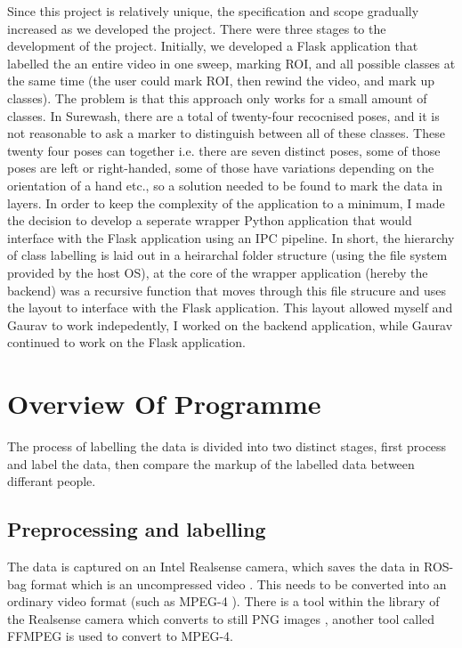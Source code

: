 Since this project is relatively unique, the specification and scope gradually increased as we developed the project. There were three stages to the development of the project. Initially, we developed a Flask application that labelled the an entire video in one sweep, marking ROI, and all possible classes at the same time (the user could mark ROI, then rewind the video, and mark up classes). The problem is that this approach only works for a small amount of classes. In Surewash, there are a total of twenty-four recocnised poses, and it is not reasonable to ask a marker to distinguish between all of these classes. These twenty four poses can together i.e. there are seven distinct poses, some of those poses are left or right-handed, some of those have variations depending on the orientation of a hand etc., so a solution needed to be found to mark the data in layers. In order to keep the complexity of the application to a minimum, I made the decision to develop a seperate wrapper Python application that would interface with the Flask application using an IPC pipeline. In short, the hierarchy of class labelling is laid out in a heirarchal folder structure (using the file system provided by the host OS), at the core of the wrapper application (hereby the backend) was a recursive function that moves through this file strucure and uses the layout to interface with the Flask application. This layout allowed myself and Gaurav to work indepedently, I worked on the backend application, while Gaurav continued to work on the Flask application.

\section{Overview Of Programme}
The process of labelling the data is divided into two distinct stages, first process and label the data, then compare the markup of the labelled data between differant people.
    \subsection{Preprocessing and labelling}
    The data is captured on an Intel Realsense camera, which saves the data in ROS-bag format which is an uncompressed video \cite{intelrosbag}. This needs to be converted into an ordinary video format (such as MPEG-4 \cite{wiegand2003overview}). There is a tool within the library of the Realsense camera which converts to still PNG images \cite{boutell1997rfc}, another tool called FFMPEG \cite{ffmpeg} is used to convert to MPEG-4. 
    
